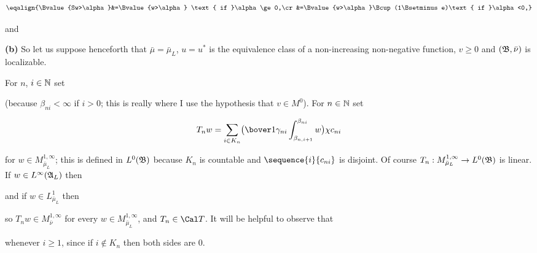 {$$\eqalign{\Bvalue{Sw>\alpha}&=\Bvalue{w>\alpha}
  \text{ if }\alpha\ge 0,\cr
&=\Bvalue{w>\alpha}\Bcup(1\Bsetminus e)\text{ if }\alpha<0,}$$
     
\noindent and
     
     
     
\medskip
     
{\bf (b)} So let us suppose henceforth that $\bar\mu=\bar\mu_L$, $u=u^*$
is the equivalence class of a non-increasing non-negative function,
$v\ge 0$ and $(\frak B,\bar\nu)$ is localizable.
     
For $n$, $i\in\Bbb N$ set
     
     
\noindent (because $\beta_{ni}<\infty$ if $i>0$;  this is really where I
use the hypothesis that $v\in M^0$).   For $n\in\Bbb N$ set
     
     
$$T_nw=\sum_{i\in
K_n}\bigl(\bover1{\gamma_{ni}}\int_{\beta_{n,i+1}}^{\beta_{ni}}w\bigr)
\chi c_{ni}$$
     
\noindent for $w\in M^{1,\infty}_{\bar\mu_L}$;  this is defined
in $L^0(\frak B)$ because $K_n$ is countable and $\sequence{i}{c_{ni}}$
is disjoint.   Of course $T_n:M^{1,\infty}_{\bar\mu_L}\to
L^0(\frak B)$ is linear.   If $w\in L^{\infty}(\frak A_L)$ then
     
     
\noindent and if $w\in L^1_{\bar\mu_L}$ then
     
     
\noindent so $T_nw\in M^{1,\infty}_{\bar\nu}$ for every $w\in
M^{1,\infty}_{\bar\mu_L}$, and $T_n\in\Cal T$.    It will be helpful to
observe that
     
     
\noindent whenever $i\ge 1$, since if $i\notin K_n$ then both sides are
$0$.
     
}
